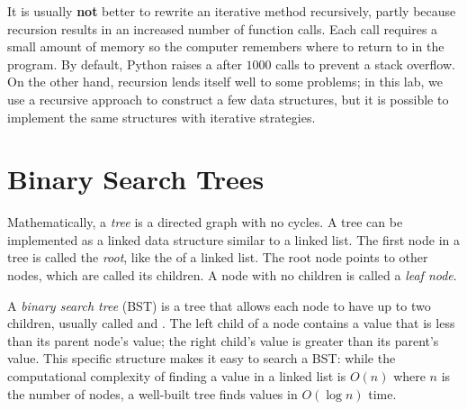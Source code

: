 \begin{warn} %
It is usually \textbf{not} better to rewrite an iterative method recursively, partly because recursion results in an increased number of function calls.
Each call requires a small amount of memory so the computer remembers where to return to in the program.
By default, Python raises a  after $1000$ calls to prevent a stack overflow.
On the other hand, recursion lends itself well to some problems; in this lab, we use a recursive approach to construct a few data structures, but it is possible to implement the same structures with iterative strategies.
\end{warn}

\section*{Binary Search Trees} %

Mathematically, a \emph{tree} is a directed graph with no cycles.
A tree can be implemented as a linked data structure similar to a linked list.
The first node in a tree is called the \emph{root}, like the  of a linked list.
The root node points to other nodes, which are called its children.
A node with no children is called a \emph{leaf node}.

A \emph{binary search tree} (BST) is a tree that allows each node to have up to two children, usually called  and .
The left child of a node contains a value that is less than its parent node's value; the right child's value is greater than its parent's value.
This specific structure makes it easy to search a BST: while the computational complexity of finding a value in a linked list is $O(n)$ where $n$ is the number of nodes, a well-built tree finds values in $O(\log{n})$ time.

